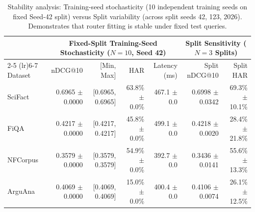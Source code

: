 \begin{table}[t]
\centering
\caption{Stability analysis: Training-seed stochasticity (10 independent training seeds on fixed Seed-42 split) versus Split variability (across split seeds 42, 123, 2026). Demonstrates that router fitting is stable under fixed test queries.}
\label{tab:stability}
\scriptsize
\setlength{\tabcolsep}{4.0pt}
\begin{tabular}{lrrrrrr}
\toprule
& \multicolumn{4}{c}{\textbf{Fixed-Split Training-Seed Stochasticity ($N=10$, Seed 42)}} & \multicolumn{2}{c}{\textbf{Split Sensitivity ($N=3$ Splits)}} \\
\cmidrule(lr){2-5} \cmidrule(lr){6-7}
Dataset & nDCG@10 & [Min, Max] & HAR & Latency (ms) & Split nDCG@10 & Split HAR \\
\midrule
SciFact & 0.6965 $\pm$ 0.0000 & [0.6965, 0.6965] & 63.8\% $\pm$ 0.0\% & 467.1 $\pm$ 0.0 & 0.6998 $\pm$ 0.0342 & 69.3\% $\pm$ 10.1\% \\
FiQA & 0.4217 $\pm$ 0.0000 & [0.4217, 0.4217] & 45.8\% $\pm$ 0.0\% & 499.1 $\pm$ 0.0 & 0.4218 $\pm$ 0.0020 & 28.4\% $\pm$ 21.8\% \\
NFCorpus & 0.3579 $\pm$ 0.0000 & [0.3579, 0.3579] & 54.9\% $\pm$ 0.0\% & 392.7 $\pm$ 0.0 & 0.3436 $\pm$ 0.0141 & 55.6\% $\pm$ 13.3\% \\
ArguAna & 0.4069 $\pm$ 0.0000 & [0.4069, 0.4069] & 15.0\% $\pm$ 0.0\% & 400.4 $\pm$ 0.0 & 0.4106 $\pm$ 0.0074 & 26.1\% $\pm$ 12.5\% \\
\bottomrule
\end{tabular}
\end{table}